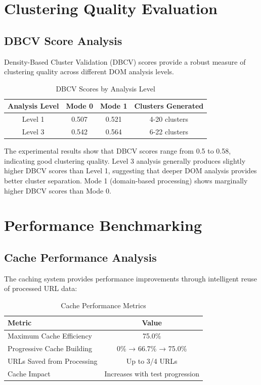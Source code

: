\section{Clustering Quality Evaluation}
\label{sec:clustering_quality}

\subsection{DBCV Score Analysis}

Density-Based Cluster Validation (DBCV) scores provide a robust measure of clustering quality across different DOM analysis levels.

\begin{table}[h]
\centering
\caption{DBCV Scores by Analysis Level}
\label{tab:dbcv_scores}
\begin{tabular}{|c|c|c|c|}
\hline
\textbf{Analysis Level} & \textbf{Mode 0} & \textbf{Mode 1} & \textbf{Clusters Generated} \\
\hline
Level 1 & 0.507 & 0.521 & 4-20 clusters \\
Level 3 & 0.542 & 0.564 & 6-22 clusters \\
\hline
\end{tabular}
\end{table}

The experimental results show that DBCV scores range from 0.5 to 0.58, indicating good clustering quality. Level 3 analysis generally produces slightly higher DBCV scores than Level 1, suggesting that deeper DOM analysis provides better cluster separation. Mode 1 (domain-based processing) shows marginally higher DBCV scores than Mode 0.

\section{Performance Benchmarking}
\label{sec:performance_benchmarking}

\subsection{Cache Performance Analysis}

The caching system provides performance improvements through intelligent reuse of processed URL data:

\begin{table}[h]
\centering
\caption{Cache Performance Metrics}
\label{tab:cache_performance}
\begin{tabular}{|l|c|}
\hline
\textbf{Metric} & \textbf{Value} \\
\hline
Maximum Cache Efficiency & 75.0\% \\
Progressive Cache Building & 0\% → 66.7\% → 75.0\% \\
URLs Saved from Processing & Up to 3/4 URLs \\
Cache Impact & Increases with test progression \\
\hline
\end{tabular}
\end{table}

